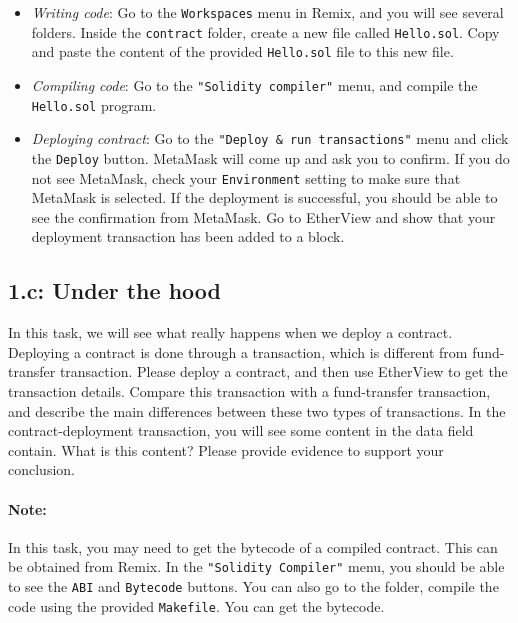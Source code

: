 \begin{itemize}
\item \textit{Writing code}: Go to the \texttt{Workspaces} menu 
in Remix, and you will see several folders.
Inside the \texttt{contract} folder, create a new file called 
\texttt{Hello.sol}. Copy and paste the content 
of the provided \texttt{Hello.sol} file to this new file.  


\item \textit{Compiling code}: Go to the \texttt{"Solidity compiler"} menu,
and compile the \texttt{Hello.sol} program.  

\item \textit{Deploying contract}:  Go to the \texttt{"Deploy \& run 
transactions"} menu and click the \texttt{Deploy} button.  
MetaMask will come up and ask you to confirm. If you do not see 
MetaMask, check your \texttt{Environment} setting to make sure 
that MetaMask is selected. If the deployment is successful,
you should be able to see the confirmation from MetaMask.
Go to EtherView and show that your deployment transaction has 
been added to a block. 

\end{itemize}


\subsection{1.c: Under the hood}

In this task, we will see what really happens when we deploy a contract.
Deploying a contract is done through a transaction, which is 
different from fund-transfer transaction. 
Please deploy a contract, and then use EtherView to get the transaction
details. Compare this transaction with a fund-transfer transaction,
and describe the main differences between these two types of 
transactions. In the contract-deployment transaction, you 
will see some content in the data field contain. What is 
this content? Please provide evidence to support your conclusion. 


\paragraph{Note:} In this task, you may need to get the 
bytecode of a compiled contract. This can be obtained from
Remix. In the \texttt{"Solidity Compiler"} menu, you should be 
able to see the \texttt{ABI} and \texttt{Bytecode} buttons. 
You can also go to the \contractfolder folder,
compile the code using the provided \texttt{Makefile}.   
You can get the bytecode. 



